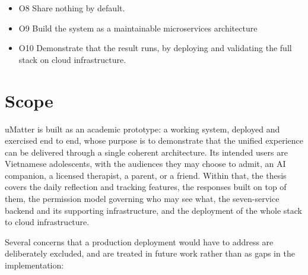 \begin{itemize}
  \item O8 Share nothing by default.

  \item O9 Build the system as a maintainable microservices
    architecture

  \item O10 Demonstrate that the result runs, by deploying and
    validating the full stack on cloud infrastructure.
\end{itemize}

\section{Scope}
\label{sec:scope}


uMatter is built as an academic prototype: a working system, deployed and
exercised end to end, whose purpose is to demonstrate that the unified
experience can be delivered
through a single coherent architecture. Its intended users are Vietnamese
adolescents, with the audiences they may choose to admit, an AI companion, a licensed therapist, a parent, or a friend. Within that, the thesis covers the daily reflection and tracking features,
the responses built on top of them, the permission model governing who may see
what, the seven-service backend and its supporting infrastructure, and the
deployment of the whole stack to cloud infrastructure.

Several concerns that a production deployment would have to address are
deliberately excluded, and are treated in 
future work rather than as gaps in the implementation:

